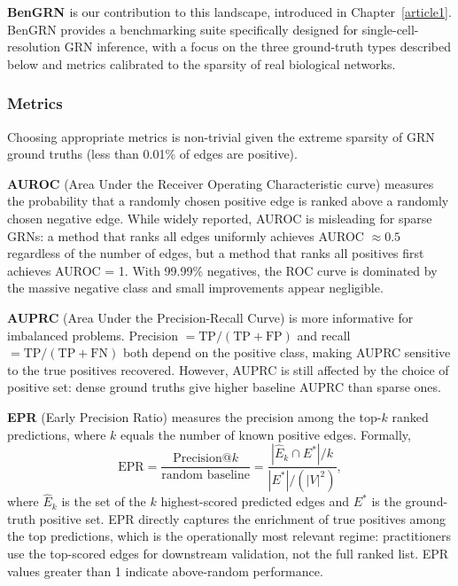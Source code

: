 \textbf{BenGRN \cite{kalfonJkobjectBenGRNAwesome2025}} is our contribution to this landscape,
introduced in Chapter~\ref{article1}. BenGRN provides a benchmarking suite specifically designed
for single-cell-resolution \gls{GRN} inference, with a focus on the three ground-truth types
described below and metrics calibrated to the sparsity of real biological networks.

\subsubsection{Metrics}
Choosing appropriate metrics is non-trivial given the extreme sparsity of \gls{GRN} ground truths
(less than 0.01\% of edges are positive).

\textbf{AUROC} (Area Under the Receiver Operating Characteristic curve) measures the probability
that a randomly chosen positive edge is ranked above a randomly chosen negative edge. While widely
reported, AUROC is misleading for sparse \glspl{GRN}: a method that ranks all edges uniformly
achieves AUROC $\approx 0.5$ regardless of the number of edges, but a method that ranks all
positives first achieves AUROC = 1. With 99.99\% negatives, the ROC curve is dominated by the
massive negative class and small improvements appear negligible.

\textbf{\gls{AUPRC}} (Area Under the Precision-Recall Curve) is more informative for imbalanced
problems. Precision \(= \text{TP}/(\text{TP}+\text{FP})\) and recall \(=
\text{TP}/(\text{TP}+\text{FN})\) both depend on the positive class, making AUPRC sensitive to the
true positives recovered. However, AUPRC is still affected by the choice of positive set: dense
ground truths give higher baseline AUPRC than sparse ones.

\textbf{\gls{EPR}} (Early Precision Ratio) measures the precision among the top-\(k\) ranked
predictions, where \(k\) equals the number of known positive edges. Formally,
\begin{equation}
  \text{EPR} = \frac{\text{Precision@}k}{\text{random baseline}} = \frac{|\hat{E}_k \cap E^*|/k}{|E^*|/(|V|^2)},
\end{equation}
where \(\hat{E}_k\) is the set of the \(k\) highest-scored predicted edges and \(E^*\) is the
ground-truth positive set. EPR directly captures the enrichment of true positives among the top
predictions, which is the operationally most relevant regime: practitioners use the top-scored
edges for downstream validation, not the full ranked list. EPR values greater than 1 indicate
above-random performance.

